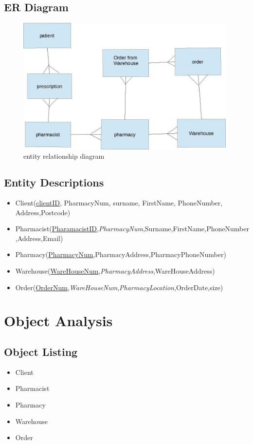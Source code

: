 \subsection{ER Diagram}
\begin{figure}[ht!]
\centering
\includegraphics[width=110mm]{table1.JPG}
\caption{entity relationship diagram \label{overflow}}
\end{figure}
\pagebreak
\subsection{Entity Descriptions}
\begin{itemize}
\item Client(\underline{clientID}, PharmacyNum, surname, FirstName, PhoneNumber, Address,Postcode)
\item Pharmacist(\underline{PharamacistID},\emph{PharmacyNum},Surname,FirstName,PhoneNumber,Address,Email)
\item Pharmacy(\underline{PharmacyNum},PharmacyAddress,PharmacyPhoneNumber)
\item Warehouse(\underline{WareHouseNum},\emph{PharmacyAddress},WareHouseAddress)
\item Order(\underline{OrderNum},\emph{WareHouseNum},\emph{PharmacyLocation},OrderDate,size)
\end{itemize}
\section{Object Analysis}

\subsection{Object Listing}
\begin{itemize}

\item Client
\item Pharmacist
\item Pharmacy
\item Warehouse
\item Order

\end{itemize}
